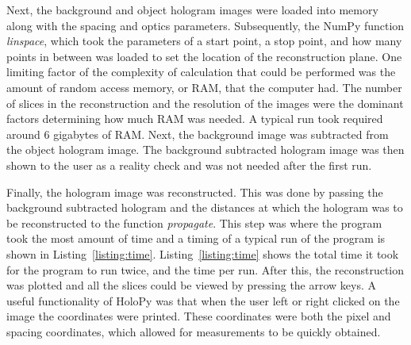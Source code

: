 

Next, the background and object hologram images were
loaded into memory along with the spacing and optics parameters. 
Subsequently, the NumPy
function \emph{linspace}, which took the parameters of a start point, a stop
point, and how many points in between was loaded to set the
location of the reconstruction plane.
One limiting factor of the complexity of calculation that could be performed
was the amount of random access
memory, or RAM, that the computer had. The number of slices in the
reconstruction and the resolution of the images were the dominant factors
determining how much RAM was needed. A typical run took required around 6
gigabytes of RAM.
Next, the background image was
subtracted from the object hologram image.
%
%
The background subtracted hologram image was then shown to the user as
a reality check and was not needed after the first run.


Finally, the hologram image was
reconstructed. This was done by passing the background subtracted hologram and
the distances at which the hologram was to be reconstructed to the function
\emph{propagate}. This step was where the program took the most amount of time
and a timing
of a typical run of the program is shown in Listing~\ref{listing:time}. 
Listing~\ref{listing:time} shows the total time it took for the program to run
twice, and the time per run.
After this,
the reconstruction was plotted and all the slices could be viewed by pressing the
arrow keys. A useful functionality of HoloPy was that when the user left or right
clicked on the image the coordinates were printed. These coordinates were both
the pixel and spacing coordinates, which allowed for measurements to be quickly
obtained.



